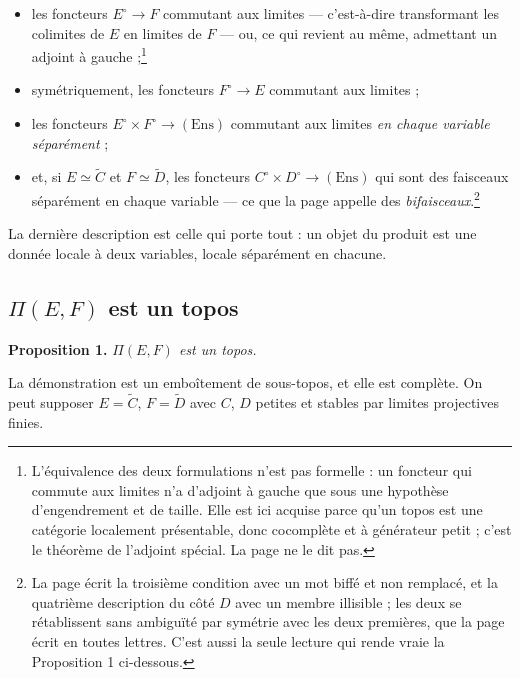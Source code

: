 \documentclass[11pt,a4paper]{article}
\begin{document}
\begin{itemize}
\item les foncteurs $E^{\circ} \to F$ commutant aux limites — c'est-à-dire
transformant les colimites de $E$ en limites de $F$ — ou, ce qui revient au
même, admettant un adjoint à gauche ;\footnote{L'équivalence des deux
formulations n'est pas formelle : un foncteur qui commute aux limites n'a
d'adjoint à gauche que sous une hypothèse d'engendrement et de taille. Elle
est ici acquise parce qu'un topos est une catégorie localement présentable,
donc cocomplète et à générateur petit ; c'est le théorème de l'adjoint spécial.
La page ne le dit pas.}
\item symétriquement, les foncteurs $F^{\circ} \to E$ commutant aux limites ;
\item les foncteurs $E^{\circ} \times F^{\circ} \to (\mathrm{Ens})$ commutant
aux limites \emph{en chaque variable séparément} ;
\item et, si $E \simeq \widetilde{C}$ et $F \simeq \widetilde{D}$, les
foncteurs $C^{\circ} \times D^{\circ} \to (\mathrm{Ens})$ qui sont des faisceaux
séparément en chaque variable — ce que la page appelle des
\emph{bifaisceaux}.\footnote{La page écrit la troisième condition avec un mot
biffé et non remplacé, et la quatrième description du côté $D$ avec un membre
illisible ; les deux se rétablissent sans ambiguïté par symétrie avec les deux
premières, que la page écrit en toutes lettres. C'est aussi la seule lecture
qui rende vraie la Proposition 1 ci-dessous.}
\end{itemize}

La dernière description est celle qui porte tout : un objet du produit est une
donnée locale à deux variables, locale séparément en chacune.

\subsection*{$\Pi(E,F)$ est un topos}

\textbf{Proposition 1.} \emph{$\Pi(E,F)$ est un topos.}

La démonstration est un emboîtement de sous-topos, et elle est complète. On
peut supposer $E = \widetilde{C}$, $F = \widetilde{D}$ avec $C$, $D$ petites et
stables par limites projectives finies.
\end{document}
